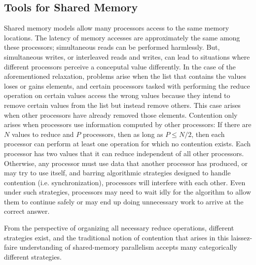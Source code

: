 \subsection{Tools for Shared Memory}
Shared memory models allow many processors access to the same memory locations.
The latency of memory accesses are approximately the same among these
processors; simultaneous reads can be performed harmlessly. But, simultaneous
writes, or interleaved reads and writes, can lead to situations where different
processors perceive a conceputal value differently. In the case of the
aforementioned relaxation, problems arise when the list that contains the values
loses or gains elements, and certain processors tasked with performing the
reduce operation on certain values access the wrong values because they intend
to remove certain values from the list but instead remove others. This case
arises when other processors have already removed those elements. Contention
only arises when processors use information computed by other processors: If
there are $N$ values to reduce and $P$ processors, then as long as $P \leq N/2$,
then each processor can perform at least one operation for which no contention
exists. Each processor has two values that it can reduce independent of all
other processors. Otherwise, any processor must use data that another processor
has produced, or may try to use itself, and barring algorithmic strategies
designed to handle contention (i.e. synchronization), processors will interfere
with each other. Even under such strategies, processors may need to wait idly
for the algorithm to allow them to continue safely or may end up doing
unnecessary work to arrive at the correct answer.

From the perspective of organizing all necessary reduce operations, different
strategies exist, and the traditional notion of contention that arises in this
laissez-faire understanding of shared-memory parallelism accepts many
categorically different strategies.

